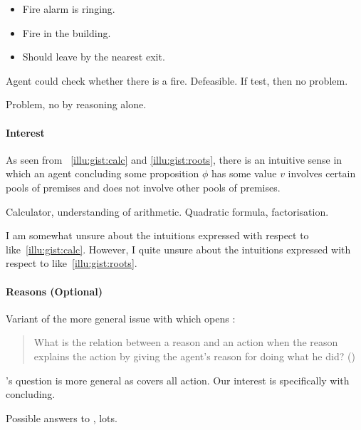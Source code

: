 \begin{note}
  \begin{illustration}
    \mbox{}
    \vspace{-\baselineskip}
    \begin{itemize}
    \item Fire alarm is ringing.
    \item Fire in the building.
    \item Should leave by the nearest exit.
    \end{itemize}
  \end{illustration}

  Agent could check whether there is a fire.
  Defeasible.
  If test, then no problem.

  Problem, no by reasoning alone.
\end{note}

\paragraph*{Interest}

\begin{note}
  As seen from ~\ref{illu:gist:calc} and \ref{illu:gist:roots}, there is an intuitive sense in which an agent concluding some proposition \(\phi\) has some value \(v\) involves certain pools of premises and does not involve other pools of premises.

  Calculator, understanding of arithmetic.
  Quadratic formula, factorisation.

  I am somewhat unsure about the intuitions expressed with respect to  like~\autoref{illu:gist:calc}.
  However, I quite unsure about the intuitions expressed with respect to  like~\autoref{illu:gist:roots}.
\end{note}

\paragraph*{Reasons \hfill (Optional)}

\begin{note}

\end{note}

\begin{note}
  Variant of the more general issue with which \citeauthor{Davidson:1963aa} opens :

  \begin{quote}
    What is the relation between a reason and an action when the reason explains the action by giving the agent’s reason for doing what he did?%
    \mbox{}\hfill\mbox{(\citeyear[685]{Davidson:1963aa})}
  \end{quote}

  \citeauthor{Davidson:1963aa}'s question is more general as covers all action.
  Our interest is specifically with concluding.

  Possible answers to \qWhy{}, lots.
\end{note}

